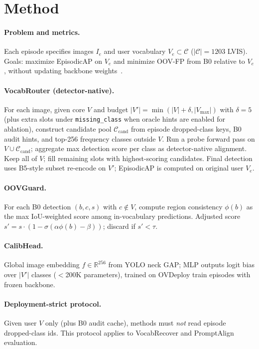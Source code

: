 \documentclass[10pt,twocolumn,letterpaper]{article}
\begin{document}
\section{Method}
\label{sec:method}

\paragraph{Problem and metrics.}
Each episode specifies images $I_e$ and user vocabulary $V_e \subset \mathcal{C}$ ($|\mathcal{C}|{=}1203$ LVIS).
Goals: maximize EpisodicAP on $V_e$ and minimize OOV-FP from B0 relative to $V_e$, without updating backbone weights~\cite{ovdeploy2026}.

\paragraph{VocabRouter (detector-native).}
For each image, given core $V$ and budget $|V'| = \min(|V|+\delta, |V_{\max}|)$ with $\delta{=}5$ (plus extra slots under \texttt{missing\_class} when oracle hints are enabled for ablation), construct candidate pool $\mathcal{C}_{\text{cand}}$ from episode dropped-class keys, B0 audit hints, and top-256 frequency classes outside $V$.
Run a probe forward pass on $V \cup \mathcal{C}_{\text{cand}}$; aggregate max detection score per class as detector-native alignment.
Keep all of $V$; fill remaining slots with highest-scoring candidates.
Final detection uses B5-style subset re-encode on $V'$; EpisodicAP is computed on original user $V_e$.

\paragraph{OOVGuard.}
For each B0 detection $(b,c,s)$ with $c \notin V$, compute region consistency $\phi(b)$ as the max IoU-weighted score among in-vocabulary predictions.
Adjusted score $s' = s \cdot (1 - \sigma(\alpha \phi(b) - \beta))$; discard if $s' < \tau$.

\paragraph{CalibHead.}
Global image embedding $f \in \mathbb{R}^{256}$ from YOLO neck GAP; MLP outputs logit bias over $|V'|$ classes ($<$200K parameters), trained on OVDeploy train episodes with frozen backbone.

\paragraph{Deployment-strict protocol.}
Given user $V$ only (plus B0 audit cache), methods must \emph{not} read episode dropped-class ids.
This protocol applies to VocabRecover and PromptAlign evaluation.
\end{document}
